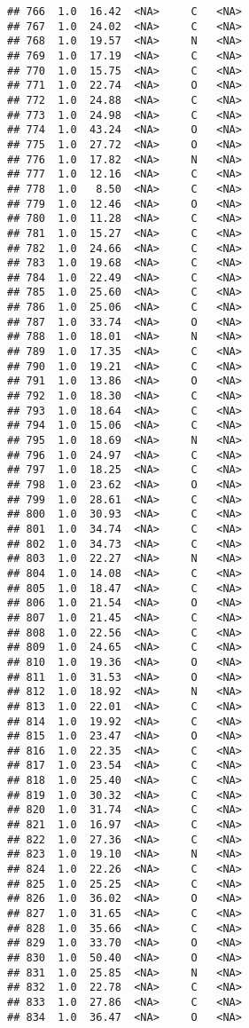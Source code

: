 \documentclass[
]{article}
\begin{document}
\begin{verbatim}
## 766  1.0  16.42  <NA>     C   <NA>
## 767  1.0  24.02  <NA>     C   <NA>
## 768  1.0  19.57  <NA>     N   <NA>
## 769  1.0  17.19  <NA>     C   <NA>
## 770  1.0  15.75  <NA>     C   <NA>
## 771  1.0  22.74  <NA>     O   <NA>
## 772  1.0  24.88  <NA>     C   <NA>
## 773  1.0  24.98  <NA>     C   <NA>
## 774  1.0  43.24  <NA>     O   <NA>
## 775  1.0  27.72  <NA>     O   <NA>
## 776  1.0  17.82  <NA>     N   <NA>
## 777  1.0  12.16  <NA>     C   <NA>
## 778  1.0   8.50  <NA>     C   <NA>
## 779  1.0  12.46  <NA>     O   <NA>
## 780  1.0  11.28  <NA>     C   <NA>
## 781  1.0  15.27  <NA>     C   <NA>
## 782  1.0  24.66  <NA>     C   <NA>
## 783  1.0  19.68  <NA>     C   <NA>
## 784  1.0  22.49  <NA>     C   <NA>
## 785  1.0  25.60  <NA>     C   <NA>
## 786  1.0  25.06  <NA>     C   <NA>
## 787  1.0  33.74  <NA>     O   <NA>
## 788  1.0  18.01  <NA>     N   <NA>
## 789  1.0  17.35  <NA>     C   <NA>
## 790  1.0  19.21  <NA>     C   <NA>
## 791  1.0  13.86  <NA>     O   <NA>
## 792  1.0  18.30  <NA>     C   <NA>
## 793  1.0  18.64  <NA>     C   <NA>
## 794  1.0  15.06  <NA>     C   <NA>
## 795  1.0  18.69  <NA>     N   <NA>
## 796  1.0  24.97  <NA>     C   <NA>
## 797  1.0  18.25  <NA>     C   <NA>
## 798  1.0  23.62  <NA>     O   <NA>
## 799  1.0  28.61  <NA>     C   <NA>
## 800  1.0  30.93  <NA>     C   <NA>
## 801  1.0  34.74  <NA>     C   <NA>
## 802  1.0  34.73  <NA>     C   <NA>
## 803  1.0  22.27  <NA>     N   <NA>
## 804  1.0  14.08  <NA>     C   <NA>
## 805  1.0  18.47  <NA>     C   <NA>
## 806  1.0  21.54  <NA>     O   <NA>
## 807  1.0  21.45  <NA>     C   <NA>
## 808  1.0  22.56  <NA>     C   <NA>
## 809  1.0  24.65  <NA>     C   <NA>
## 810  1.0  19.36  <NA>     O   <NA>
## 811  1.0  31.53  <NA>     O   <NA>
## 812  1.0  18.92  <NA>     N   <NA>
## 813  1.0  22.01  <NA>     C   <NA>
## 814  1.0  19.92  <NA>     C   <NA>
## 815  1.0  23.47  <NA>     O   <NA>
## 816  1.0  22.35  <NA>     C   <NA>
## 817  1.0  23.54  <NA>     C   <NA>
## 818  1.0  25.40  <NA>     C   <NA>
## 819  1.0  30.32  <NA>     C   <NA>
## 820  1.0  31.74  <NA>     C   <NA>
## 821  1.0  16.97  <NA>     C   <NA>
## 822  1.0  27.36  <NA>     C   <NA>
## 823  1.0  19.10  <NA>     N   <NA>
## 824  1.0  22.26  <NA>     C   <NA>
## 825  1.0  25.25  <NA>     C   <NA>
## 826  1.0  36.02  <NA>     O   <NA>
## 827  1.0  31.65  <NA>     C   <NA>
## 828  1.0  35.66  <NA>     C   <NA>
## 829  1.0  33.70  <NA>     O   <NA>
## 830  1.0  50.40  <NA>     O   <NA>
## 831  1.0  25.85  <NA>     N   <NA>
## 832  1.0  22.78  <NA>     C   <NA>
## 833  1.0  27.86  <NA>     C   <NA>
## 834  1.0  36.47  <NA>     O   <NA>

\end{verbatim}
\end{document}
